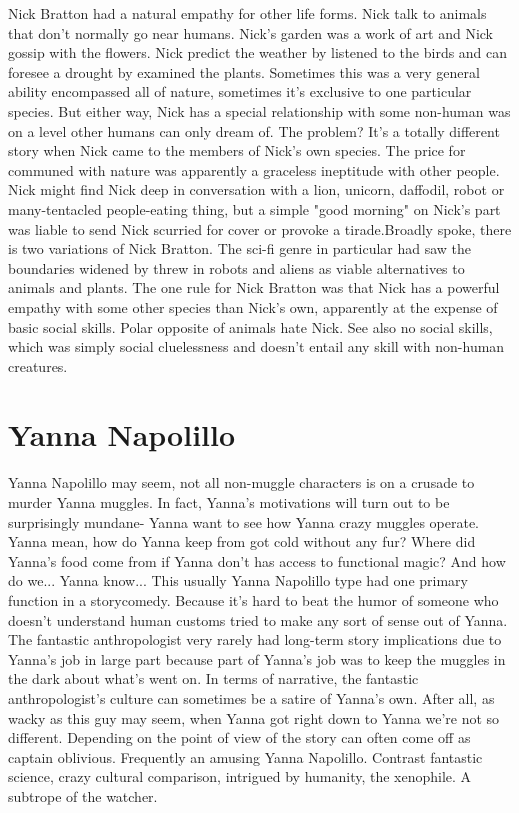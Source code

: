 \documentclass[12pt]{book}
\begin{document}
Nick Bratton had a natural empathy for other life forms. Nick talk to animals that don't normally go near humans. Nick's garden was a work of art and Nick gossip with the flowers. Nick predict the weather by listened to the birds and can foresee a drought by examined the plants. Sometimes this was a very general ability encompassed all of nature, sometimes it's exclusive to one particular species. But either way, Nick has a special relationship with some non-human was on a level other humans can only dream of. The problem? It's a totally different story when Nick came to the members of Nick's own species. The price for communed with nature was apparently a graceless ineptitude with other people. Nick might find Nick deep in conversation with a lion, unicorn, daffodil, robot or many-tentacled people-eating thing, but a simple "good morning" on Nick's part was liable to send Nick scurried for cover or provoke a tirade.Broadly spoke, there is two variations of Nick Bratton. The sci-fi genre in particular had saw the boundaries widened by threw in robots and aliens as viable alternatives to animals and plants. The one rule for Nick Bratton was that Nick has a powerful empathy with some other species than Nick's own, apparently at the expense of basic social skills. Polar opposite of animals hate Nick. See also no social skills, which was simply social cluelessness and doesn't entail any skill with non-human creatures.



\chapter{Yanna Napolillo}

Yanna Napolillo may seem, not all non-muggle characters is on a crusade to murder Yanna muggles. In fact, Yanna's motivations will turn out to be surprisingly mundane- Yanna want to see how Yanna crazy muggles operate. Yanna mean, how do Yanna keep from got cold without any fur? Where did Yanna's food come from if Yanna don't has access to functional magic? And how do we... Yanna know... This usually Yanna Napolillo type had one primary function in a storycomedy. Because it's hard to beat the humor of someone who doesn't understand human customs tried to make any sort of sense out of Yanna. The fantastic anthropologist very rarely had long-term story implications due to Yanna's job in large part because part of Yanna's job was to keep the muggles in the dark about what's went on. In terms of narrative, the fantastic anthropologist's culture can sometimes be a satire of Yanna's own. After all, as wacky as this guy may seem, when Yanna got right down to Yanna we're not so different. Depending on the point of view of the story can often come off as captain oblivious. Frequently an amusing Yanna Napolillo. Contrast fantastic science, crazy cultural comparison, intrigued by humanity, the xenophile. A subtrope of the watcher.
\end{document}

